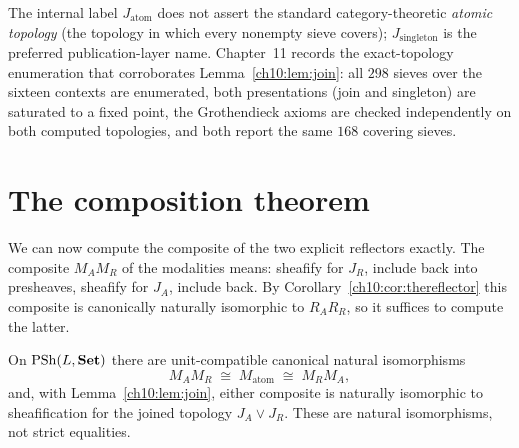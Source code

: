 \begin{boundary}
\label{ch10:bnd:atomname}
The internal label $J_{\mathrm{atom}}$ does not assert the standard
category-theoretic \emph{atomic topology} (the topology in which every
nonempty sieve covers); $J_{\mathrm{singleton}}$ is the preferred
publication-layer name. Chapter~11 records the exact-topology enumeration
that corroborates Lemma~\ref{ch10:lem:join}: all $298$ sieves over the
sixteen contexts are enumerated, both presentations (join and singleton) are
saturated to a fixed point, the Grothendieck axioms are checked independently
on both computed topologies, and both report the same $168$ covering sieves.
\end{boundary}

\section{The composition theorem}
\label{ch10:sec:composition}

We can now compute the composite of the two explicit reflectors exactly. The
composite $M_A M_R$ of the modalities means: sheafify for $J_R$, include back
into presheaves, sheafify for $J_A$, include back. By
Corollary~\ref{ch10:cor:thereflector} this composite is canonically naturally
isomorphic to $R_A R_R$, so it suffices to compute the latter.

\begin{theorem}
\label{ch10:thm:composition}
On $\mathrm{PSh}(L, \mathbf{Set})$ there are unit-compatible canonical natural isomorphisms
\[
M_A M_R \;\cong\; M_{\mathrm{atom}} \;\cong\; M_R M_A,
\]
and, with Lemma~\ref{ch10:lem:join}, either composite is naturally isomorphic
to sheafification for the joined topology $J_A \vee J_R$. These are natural
isomorphisms, not strict equalities.
\end{theorem}

